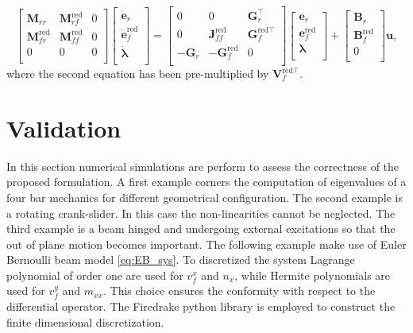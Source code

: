 \documentclass{svjour3}                     %
\begin{document}
\begin{equation}
\begin{bmatrix}
\bm{M}_{rr} & \bm{M}_{rf}^{\text{red}} & 0 \\ 
\bm{M}_{fr}^{\text{red}} & \bm{M}_{ff}^{\text{red}} & 0 \\
0 & 0 & 0 \\
\end{bmatrix}
\begin{bmatrix}
\dot{\bm{e}}_r \\ \dot{\bm{e}}_f^{\text{red}} \\ \dot{\bm{\lambda}} \\ 
\end{bmatrix} = 
\begin{bmatrix}
0 & 0 & \bm{G}_r^\top \\ 
0 & \bm{J}_{ff}^{\text{red}} & \bm{G}_f^{\text{red} \top} \\ 
-\bm{G}_r & -\bm{G}_f^{\text{red}} & 0 \\
\end{bmatrix}
\begin{bmatrix}
\bm{e}_r \\ \bm{e}_f^{\text{red}} \\ {\bm{\lambda}} \\ 
\end{bmatrix} + 
\begin{bmatrix}
\bm{B}_r \\ \bm{B}_f^{\text{red}} \\ 0 \\
\end{bmatrix}\bm{u},
\end{equation}
where the second equation has been pre-multiplied by $\bm{V}_f^{\text{red} \top}$.  

\section{Validation}
\label{sec:valid}

In this section numerical simulations are perform to assess the correctness of the proposed formulation. A first example corners the computation of eigenvalues of a four bar mechanics for different geometrical configuration. The second example is a rotating crank-slider. In this case the non-linearities cannot be neglected. The third example is a beam hinged and undergoing external excitations so that the out of plane motion becomes important. The following example make use of Euler Bernoulli beam model \eqref{eq:EB_sys}. To discretized the system Lagrange polynomial of order one are used for $v_f^x$ and $n_x$, while Hermite polynomials are used for $v_f^y$ and $m_{xx}$. This choice ensures the conformity with respect to the differential operator. The Firedrake python library \cite{rathgeber2017firedrake} is employed to construct the finite dimensional discretization.  
\end{document}
